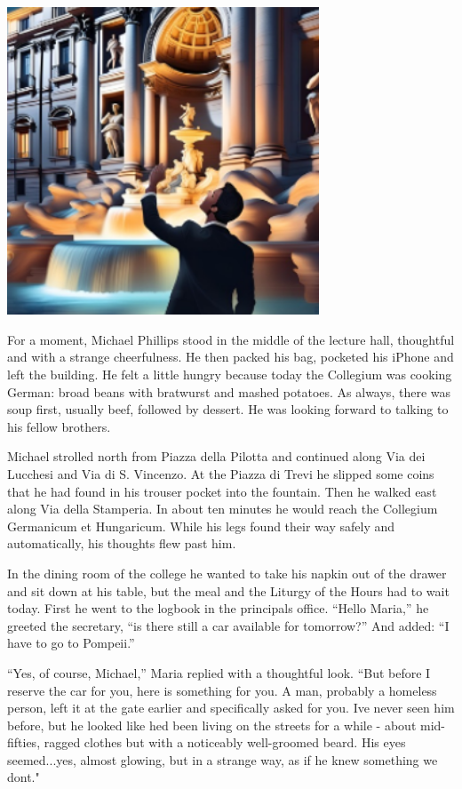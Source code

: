 \documentclass[
]{article}
\begin{document}
\includegraphics[width=3.6596in,height=3.61705in]{media/image16.png}

For a moment, Michael Phillips stood in the middle of the lecture hall,
thoughtful and with a strange cheerfulness. He then packed his bag,
pocketed his iPhone and left the building. He felt a little hungry
because today the Collegium was cooking German: broad beans with
bratwurst and mashed potatoes. As always, there was soup first, usually
beef, followed by dessert. He was looking forward to talking to his
fellow brothers.

Michael strolled north from Piazza della Pilotta and continued along Via
dei Lucchesi and Via di S. Vincenzo. At the Piazza di Trevi he slipped
some coins that he had found in his trouser pocket into the fountain.
Then he walked east along Via della Stamperia. In about ten minutes he
would reach the Collegium Germanicum et Hungaricum. While his legs found
their way safely and automatically, his thoughts flew past him.

In the dining room of the college he wanted to take his napkin out of
the drawer and sit down at his table, but the meal and the Liturgy of
the Hours had to wait today. First he went to the logbook in the
principal\textquotesingle s office. ``Hello Maria,'' he greeted the
secretary, ``is there still a car available for tomorrow?'' And added:
``I have to go to Pompeii.''

``Yes, of course, Michael,'' Maria replied with a thoughtful look. ``But
before I reserve the car for you, here is something for you. A man,
probably a homeless person, left it at the gate earlier and specifically
asked for you. I\textquotesingle ve never seen him before, but he looked
like he\textquotesingle d been living on the streets for a while - about
mid-fifties, ragged clothes but with a noticeably well-groomed beard.
His eyes seemed...yes, almost glowing, but in a strange way, as if he
knew something we don\textquotesingle t."
\end{document}
